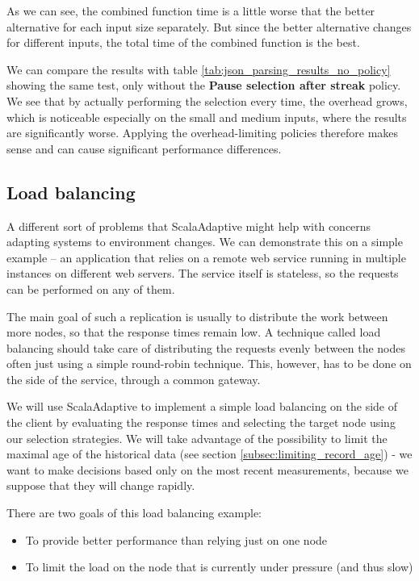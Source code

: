 As we can see, the combined function time is a little worse that the better alternative for each input size separately. But since the better alternative changes for different inputs, the total time of the combined function is the best.

We can compare the results with table \ref{tab:json_parsing_results_no_policy} showing the same test, only without the \textbf{Pause selection after streak} policy. We see that by actually performing the selection every time, the overhead grows, which is noticeable especially on the small and medium inputs, where the results are significantly worse. Applying the overhead-limiting policies therefore makes sense and can cause significant performance differences.

\subsection{Load balancing}

A different sort of problems that ScalaAdaptive might help with concerns adapting systems to environment changes. We can demonstrate this on a simple example -- an application that relies on a remote web service running in multiple instances on different web servers. The service itself is stateless, so the requests can be performed on any of them.

The main goal of such a replication is usually to distribute the work between more nodes, so that the response times remain low. A technique called load balancing should take care of distributing the requests evenly between the nodes often just using a simple round-robin technique. This, however, has to be done on the side of the service, through a common gateway. 

We will use ScalaAdaptive to implement a simple load balancing on the side of the client by evaluating the response times and selecting the target node using our selection strategies. We will take advantage of the possibility to limit the maximal age of the historical data (see section \ref{subsec:limiting_record_age}) - we want to make decisions based only on the most recent measurements, because we suppose that they will change rapidly.

There are two goals of this load balancing example:

\begin{itemize}
	\item To provide better performance than relying just on one node
	\item To limit the load on the node that is currently under pressure (and thus slow)
\end{itemize}

